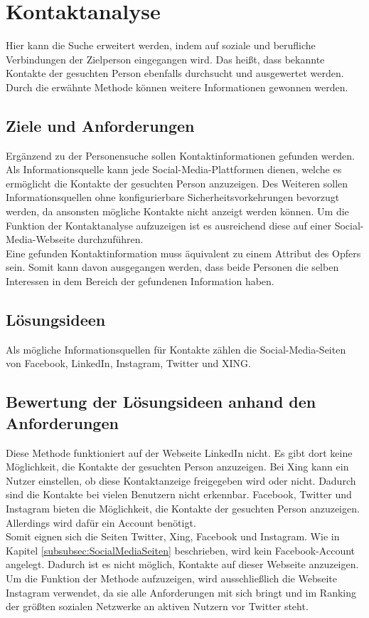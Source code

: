 \section{Kontaktanalyse}
\label{subsec:Kontaktanalyse}
Hier kann die Suche erweitert werden, indem auf soziale und berufliche Verbindungen der Zielperson eingegangen wird. Das heißt, dass bekannte Kontakte der gesuchten Person ebenfalls durchsucht und ausgewertet werden. 	
Durch die erwähnte Methode können weitere Informationen gewonnen werden.

	\subsection{Ziele und Anforderungen}
	Ergänzend zu der Personensuche sollen Kontaktinformationen gefunden werden.  Als Informationsquelle kann jede Social-Media-Plattformen dienen, welche es ermöglicht die Kontakte der gesuchten Person anzuzeigen.  Des Weiteren sollen Informationsquellen ohne  konfigurierbare Sicherheitsvorkehrungen bevorzugt werden, da ansonsten mögliche Kontakte nicht anzeigt werden können.  Um die Funktion der Kontaktanalyse aufzuzeigen ist es ausreichend diese auf einer Social-Media-Webseite durchzuführen.\\
	Eine gefunden Kontaktinformation muss äquivalent zu  einem Attribut  des Opfers sein. Somit kann davon ausgegangen werden, dass beide Personen die selben Interessen in dem Bereich der gefundenen Information haben. 
	
	\subsection{Lösungsideen} 
	Als mögliche Informationsquellen für Kontakte zählen die Social-Media-Seiten von Facebook, LinkedIn, Instagram, Twitter und XING.

	\subsection{Bewertung der Lösungsideen anhand den Anforderungen}
	Diese Methode funktioniert auf der Webseite LinkedIn nicht. Es gibt dort keine Möglichkeit, die Kontakte der gesuchten Person anzuzeigen. Bei Xing kann ein Nutzer einstellen, ob diese Kontaktanzeige freigegeben wird oder nicht. Dadurch sind die Kontakte bei vielen Benutzern nicht erkennbar. Facebook, Twitter und Instagram bieten die Möglichkeit, die Kontakte der gesuchten Person anzuzeigen. Allerdings wird dafür ein Account benötigt.\\
	Somit eignen sich die Seiten Twitter, Xing, Facebook und Instagram. Wie in Kapitel \ref{subsubsec:SocialMediaSeiten} beschrieben, wird kein Facebook-Account angelegt. Dadurch ist es nicht möglich, Kontakte auf dieser Webseite anzuzeigen. Um die Funktion der Methode aufzuzeigen, wird ausschließlich die Webseite Instagram verwendet, da sie alle Anforderungen mit sich bringt und im Ranking der größten sozialen Netzwerke an aktiven Nutzern vor Twitter steht. \cite{RankingSozialeNetzwerke}

